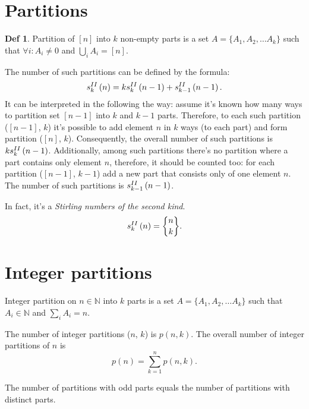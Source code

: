 \documentclass[a4paper]{article}
\theoremstyle{definition}
\newtheorem{definition}{Def}
\begin{document}
\section{Partitions}

\begin{definition}
  Partition of \([n]\) into \(k\) non-empty parts is
  a set \(A = \{A_1, A_2, \ldots A_k\}\)
  such that \(\forall i : A_i \neq 0\) and \(\bigcup_i A_i = [n]\).
\end{definition}

The number of such partitions can be defined by the formula:
\[
  s_{k}^{II}\left(n\right) = k s_{k}^{II}\left(n - 1\right) + s_{k - 1}^{II}\left(n - 1\right)
.\]
It can be interpreted in the following the way:
assume it's known how many ways to partition
set \([n - 1]\) into \(k\) and \(k - 1\) parts.
Therefore, to each such partition (\([n - 1]\), \(k\)) it's possible
to add element \(n\) in \(k\) ways (to each part) and form partition (\([n]\),
\(k\)).
Consequently, the overall number of such partitions is \(k s_{k}^{II}\left(n - 1\right)\).
Additionally, among such partitions there's no partition where a part contains
only element \(n\), therefore, it should be counted too: for each partition
(\([n - 1]\), \(k - 1\)) add a new part that consists only of one element
\(n\). The number of such partitions is \(s_{k - 1}^{II}\left(n - 1\right)\).

In fact, it's a \textit{Stirling numbers of the second kind}.
\[
  \StIn{k}{n} = \stirling{n}{k}
.\]

\section{Integer partitions}
  Integer partition on \(n \in \mathbb{N}\) into \(k\) parts is a set
  \(A = \{A_1, A_2, \ldots A_k\}\) such that \(A_i \in \mathbb{N}\)
  and \(\sum_{i} A_i = n\).

The number of integer partitions (\(n\), \(k\)) is \(p(n, k)\).
The overall number of integer partitions of \(n\) is
\[
  p(n) = \sum_{k = 1}^{n} p(n, k)
.\]

The number of partitions with odd parts equals the number of partitions with
distinct parts.
\end{document}
